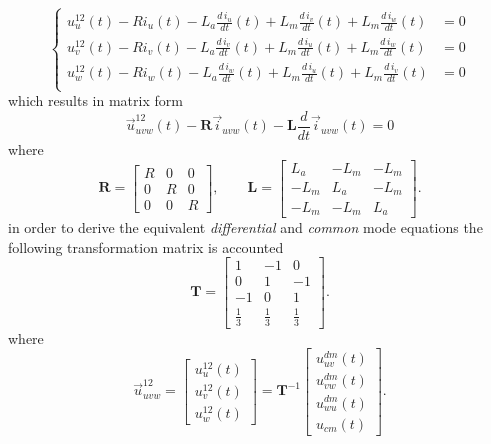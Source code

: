 \documentclass[11pt,a4paper]{scrartcl}
\begin{document}
\begin{onehalfspace}
	\begin{equation}\left\lbrace 
		\begin{aligned}
			u_u^{12}(t) -R i_u(t) - L_a \frac{d\,i_u}{dt}(t) + L_m \frac{d\,i_v}{dt}(t) + L_m \frac{d\,i_w}{dt}(t) &= 0 \\[6pt]
			u_v^{12}(t) -R i_v(t) - L_a \frac{d\,i_v}{dt}(t) + L_m \frac{d\,i_u}{dt}(t) + L_m \frac{d\,i_w}{dt}(t) &= 0 \\[6pt]
			u_w^{12}(t) -R i_w(t) - L_a \frac{d\,i_w}{dt}(t) + L_m \frac{d\,i_u}{dt}(t) + L_m \frac{d\,i_v}{dt}(t) &= 0 \\[6pt]
		\end{aligned}\right. 
	\end{equation}
	which results in matrix form
	\begin{equation}
		\vec{u}_{uvw}^{12}(t) - \mathbf{R}\vec{i}_{uvw}(t) - \mathbf{L}\frac{d}{dt}\vec{i}_{uvw}(t) = 0
	\end{equation}
	where
	\begin{equation}
		\mathbf{R} = \begin{bmatrix} R & 0 & 0 \\ 0 & R & 0 \\ 0 & 0 & R \end{bmatrix}, \qquad 
		\mathbf{L} = \begin{bmatrix} L_a & -L_m & -L_m \\ -L_m & L_a & -L_m \\ -L_m & -L_m & L_a \end{bmatrix}.
	\end{equation}
	in order to derive the equivalent \textit{differential} and \textit{common} mode equations the following transformation matrix is accounted
	\begin{equation}
		\mathbf{T} = \begin{bmatrix} 1 & -1 & 0 \\ 0 & 1 & -1 \\ -1 & 0 & 1 \\ \frac{1}{3} & \frac{1}{3} & \frac{1}{3} \end{bmatrix}.
	\end{equation}
	where
	\begin{equation}
		\vec{u}_{uvw}^{12} = \begin{bmatrix} u^{12}_{u}(t) \\[6pt] u^{12}_{v}(t) \\[6pt] u^{12}_{w}(t) \end{bmatrix}= \mathbf{T}^{-1}\begin{bmatrix} u^{dm}_{uv}(t) \\[6pt] u^{dm}_{vw}(t) \\[6pt] u^{dm}_{wu}(t) \\[6pt] u_{cm}(t) \end{bmatrix}.

\end{equation}
\end{onehalfspace}
\end{document}
